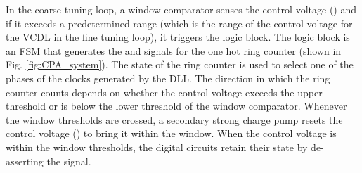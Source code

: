 \documentclass[journal,twoside,letterpaper]{IEEEtran}
\begin{document}
In the coarse tuning loop,
a window comparator senses the control voltage ()
and if it exceeds a predetermined range
(which is the range of the control voltage for the VCDL
in the fine tuning loop), it triggers the logic block.
The logic block is an FSM that
generates the  and  signals
for the one hot ring counter (shown 
in Fig. \ref{fig:CPA_system}).
The state of the ring counter is used
to select one of the phases of the clocks generated by the DLL.
The direction in which the ring counter counts
depends on whether the control voltage exceeds the upper threshold
or is below the lower threshold of the window comparator.
Whenever the window thresholds are crossed,
a secondary strong charge pump resets the control voltage ()
to bring it within the window.
When the control voltage is within the window thresholds,
the digital circuits retain their state by de-asserting the
 signal.
\end{document}
